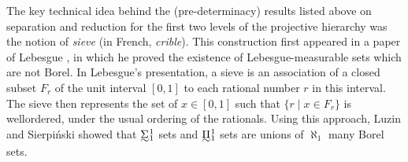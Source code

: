 \documentclass{book}%
\def\underTilde#1{{\baselineskip=0pt\vtop{\hbox{$#1$}\hbox{$\sim$}}}{}}
\newcommand{\uTPi}{\underTilde{\Pi}}
\newcommand{\uTSigma}{\underTilde{\Sigma}}
\begin{document}
The key technical idea behind the (pre-determinacy) results listed above on separation and reduction for the first two levels of the projective hierarchy was the notion of \emph{sieve} (in French, \emph{crible}). This construction first appeared in a paper of Lebesgue , in which he proved the existence of Lebesgue-measurable sets which are not Borel. In Lebesgue's presentation, a sieve is an association of a closed subset $F_{r}$ of the unit interval $[0,1]$ to each rational number $r$ in this interval. The sieve then represents the set of $x \in [0,1]$ such that $\{ r \mid x \in F_{r}\}$ is wellordered, under the usual ordering of the rationals.
Using this approach, Luzin and Sierpi\'{n}ski  showed that $\uTSigma^{1}_{1}$ sets and $\uTPi^{1}_{1}$ sets are unions of
$\aleph_{1}$ many Borel sets.


\end{document}
